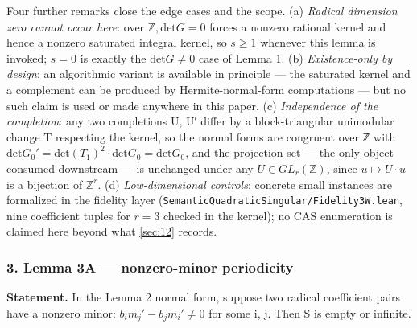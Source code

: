 \documentclass[11pt]{article}
\theoremstyle{plain}
\theoremstyle{definition}
\theoremstyle{remark}
\theoremstyle{plain}
\theoremstyle{definition}
\theoremstyle{remark}
\theoremstyle{plain}
\theoremstyle{definition}
\theoremstyle{remark}
\begin{document}
Four further remarks close the edge cases and the scope. (a) \emph{Radical dimension zero cannot occur here}: over $ℤ, \mathrm{det} G = 0$ forces a nonzero rational kernel and hence a nonzero saturated integral kernel, so $s ≥ 1$ whenever this lemma is invoked; $s = 0$ is exactly the $\mathrm{det} G ≠ 0$ case of Lemma 1. (b) \emph{Existence-only by design}: an algorithmic variant is available in principle — the saturated kernel and a complement can be produced by Hermite-normal-form computations — but no such claim is used or made anywhere in this paper. (c) \emph{Independence of the completion}: any two completions U, U′ differ by a block-triangular unimodular change T respecting the kernel, so the normal forms are congruent over ℤ with $\mathrm{det} G_{0}′ = \mathrm{det}(T_{1})^{2}·\mathrm{det} G_{0} = \mathrm{det} G_{0}$, and the projection set — the only object consumed downstream — is unchanged under any $U ∈ GL_{r}(ℤ)$, since $u ↦ U·u$ is a bijection of $ℤ^{r}$. (d) \emph{Low-dimensional controls}: concrete small instances are formalized in the fidelity layer (\texttt{SemanticQuadraticSingular/Fidelity3W.\allowbreak{}lean}, nine coefficient tuples for $r = 3$ checked in the kernel); no CAS enumeration is claimed here beyond what \cref{sec:12} records.

\subsubsection*{3. Lemma 3A — nonzero-minor periodicity}
\textbf{Statement.} In the Lemma 2 normal form, suppose two radical coefficient pairs have a nonzero minor: $b_{i}m_{j}′ − b_{j}m_{i}′ ≠ 0$ for some i, j. Then S is empty or infinite.
\end{document}
